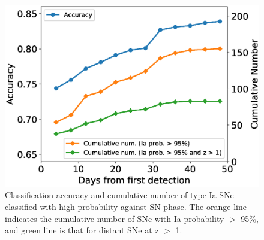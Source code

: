 \documentclass[useamsfonts]{pasj01}
\begin{document}
\begin{figure}[htbp]
  \begin{center}
     \includegraphics[width=\columnwidth]{figures/n_observations_SNphase_v200318.eps}
  \end{center}
  \caption{%
  Classification accuracy and cumulative number of type Ia SNe classified with high probability against SN phase.
  The orange line indicates the cumulative number of SNe with Ia probability $>$ 95\%, and green line is that for distant SNe at z $>$ 1. %
  }%
  \label{fig:n_observations_SNphase}
\end{figure}
%
\end{document}
